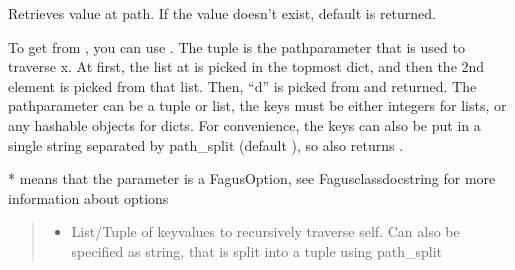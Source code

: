 \documentclass[a4paper,10pt,english]{sphinxmanual}
\begin{document}
\begin{fulllineitems}
\begin{fulllineitems}
\end{fulllineitems}


\begin{fulllineitems}
\label{\detokenize{fagus.fagus:fagus.fagus.Fagus.get}}
\pysigstartsignatures
{}
\pysigstopsignatures
\sphinxAtStartPar
Retrieves value at path. If the value doesn’t exist, default is returned.

\sphinxAtStartPar
To get  from , you can use
. The tuple  is the path\sphinxhyphen{}parameter that is used to traverse x. At first,
the list at  is picked in the top\sphinxhyphen{}most dict, and then the 2nd element  is picked from that
list. Then, “d” is picked from  and returned. The path\sphinxhyphen{}parameter can be a tuple or list, the keys
must be either integers for lists, or any hashable objects for dicts. For convenience, the keys can also be put
in a single string separated by path\_split (default ), so  also returns .

\sphinxAtStartPar
* means that the parameter is a FagusOption, see Fagus\sphinxhyphen{}class\sphinxhyphen{}docstring for more information about options
\begin{quote}\begin{description}
\begin{itemize}
\item {}
\sphinxAtStartPar
{} \textendash{} List/Tuple of key\sphinxhyphen{}values to recursively traverse self. Can also be specified as string, that is split
into a tuple using path\_split


\end{itemize}
\end{description}
\end{quote}
\end{fulllineitems}
\end{fulllineitems}
\end{document}

